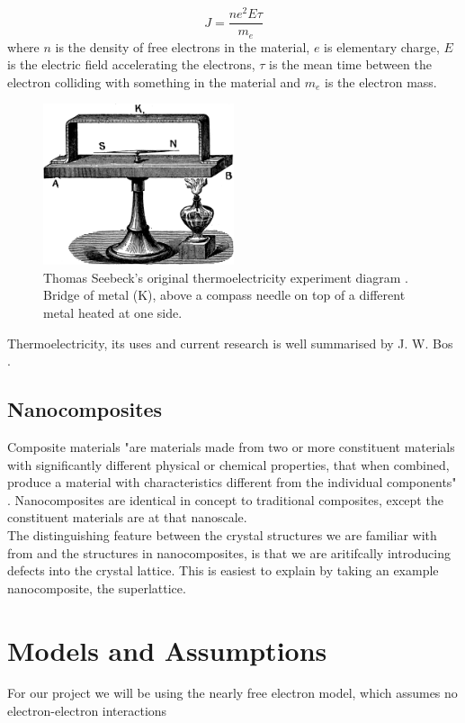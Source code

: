\documentclass[a4paper,10pt,journal]{IEEEtran}
\begin{document}
\begin{equation}
\label{micro-ohm}
	J = \frac{ne^2E \tau}{m_e}
\end{equation}
where $n$ is the density of free electrons in the material, $e$ is
elementary charge, $E$ is the electric field accelerating the
electrons, $\tau$ is the mean time between the electron colliding with
something in the material and $m_e$ is the electron mass.

\begin{figure}
	\centering
	\includegraphics[width=0.5\textwidth]{seebeck-experiment-black.png}
	\caption{Thomas Seebeck's original thermoelectricity experiment
	diagram \cite{seebeck-original}. Bridge of metal (K), above a compass
	needle on top of a different metal heated at one side.}
	\label{seebeck-experiment}
\end{figure}

Thermoelectricity, its uses and current research is well summarised by
J. W. Bos \cite{rsc-eic}.

\subsection{Nanocomposites}
Composite materials "are materials made from two or more constituent
materials with significantly different physical or chemical
properties, that when combined, produce a material with
characteristics different from the individual
components" \cite{wiki-composite}. Nanocomposites are identical in
concept to traditional composites, except the constituent materials
are at that nanoscale.\\
The distinguishing feature between the crystal structures we are familiar with from  and the structures in nanocomposites, is that we are aritifcally introducing defects into the crystal lattice. This is easiest to explain by taking an example nanocomposite, the superlattice.

\section{Models and Assumptions}
For our project we will be using the nearly free electron model, which
assumes no electron-electron interactions
\end{document}
